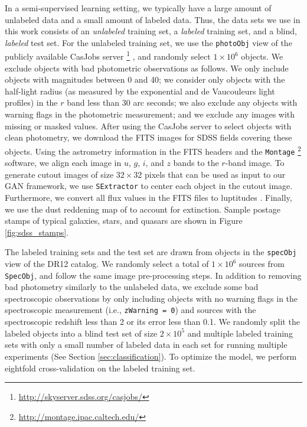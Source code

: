 \documentclass[fleqn,usenatbib]{mnras}
\newcommand{\ie}{{i.e., }}
\begin{document}
In a semi-supervised learning setting, we typically have a large amount of unlabeled data
and a small amount of labeled data.
Thus, the data sets we use in this work consists of an \emph{unlabeled} training set,
a \emph{labeled} training set, and a blind, \emph{labeled} test set.
For the unlabeled training set, we use the \texttt{photoObj} view of the publicly available CasJobs server \footnote{\url{http://skyserver.sdss.org/casjobs/}} \citep{li2008casjobs},
and randomly select $1 \times 10^6$ objects.
We exclude objects with bad photometric observations as follows.
We only include objects with magnitudes between 0 and 40;
we consider only objects with the half-light radius (as measured by the exponential and de Vaucouleurs light profiles)
in the $r$ band less than 30 arc seconds;
we also exclude any objects with warning flags in the photometric measurement;
and we exclude any images with missing or masked values.
After using the CasJobs server to select objects with clean photometry,
we download the FITS images for SDSS fields covering these objects.
Using the astrometry information in the FITS headers and the \texttt{Montage} \footnote{\url{http://montage.ipac.caltech.edu/}} software,
we align each image in $u$, $g$, $i$, and $z$ bands to the $r$-band image.
To generate cutout images of size $32 \times 32$ pixels that can be used as input to our GAN framework,
we use \texttt{SExtractor} to center each object in the cutout image.
Furthermore, we convert all flux values in the FITS files to luptitudes
\citep[\ie inverse hyperbolic sine magnitudes;][]{lupton1999modified}.
Finally, we use the dust reddening map of \citet{schlegel1998maps} to account for extinction.
Sample postage stamps of typical galaxies, stars, and quasars are shown in Figure \ref{fig:sdss_stamps}.

The labeled training sets and the test set are drawn from objects in the \texttt{specObj} view of the DR12 catalog.
We randomly select a total of $1 \times 10^6$ sources from \texttt{SpecObj}, and follow the same image pre-processing steps.
In addition to removing bad photometry similarly to the unlabeled data,
we exclude some bad spectroscopic observations by only including objects with no warning flags in the spectroscopic measurement
(\ie \texttt{zWarning = 0})
and sources with the spectroscopic redshift less than 2 or its error less than 0.1.
We randomly split the labeled objects into a blind test set of size $ 2 \times 10^5$ and multiple labeled training sets
with only a small number of labeled data in each set for running multiple experiments (See Section \ref{sec:classification}).
To optimize the model, we perform eightfold cross-validation on the labeled training set.
\end{document}
